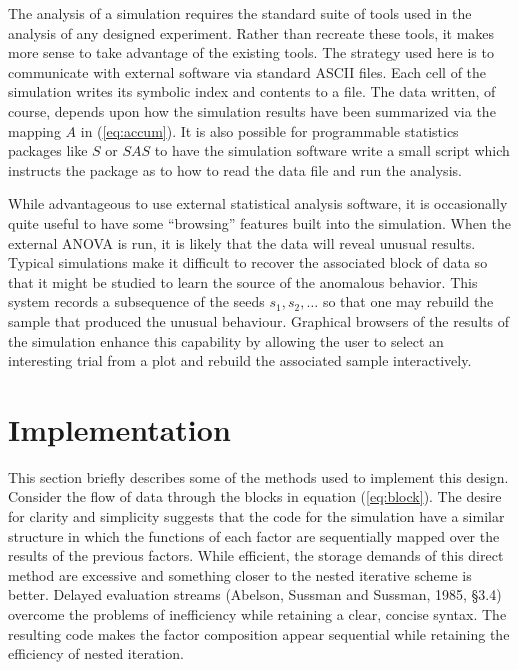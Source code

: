 The analysis of a simulation requires the standard suite of tools
used in the analysis of any designed experiment.  Rather than
recreate these tools, it makes more sense to take advantage of the
existing tools. The strategy used here is to communicate with
external software via standard ASCII files.  Each cell of the
simulation writes its symbolic index and contents to a file. The data
written, of course, depends upon how the simulation results have been
summarized via the mapping $A$ in (\ref{eq:accum}).  It is also
possible for programmable statistics packages like $S$ or $SAS$ to
have the simulation software write a small script which instructs the
package as to how to read the data file and run the analysis.  


While advantageous to use external statistical analysis software, it
is occasionally quite useful to have some ``browsing'' features built
into the simulation.  When the external ANOVA is run, it is likely
that the data will reveal unusual results.   Typical simulations make
it difficult to recover the associated block of data so that it might
be studied to learn the source of the anomalous behavior.  This system
records a subsequence of the seeds $s_1, s_2,\ldots$ so that
one may rebuild the sample that produced the unusual behaviour.
Graphical browsers of the results of the simulation enhance this
capability by allowing the user to select an interesting trial from a
plot and rebuild the associated sample interactively. 



\section{Implementation}


This section briefly describes some of the methods used to 
implement this design. Consider the flow of data through the
blocks in equation (\ref{eq:block}).  The desire for clarity and
simplicity suggests that the code for the simulation have a
similar structure in which the functions of each factor are sequentially
mapped over the results of the previous factors. While efficient, the
storage demands of this direct method are excessive and something
closer to the nested iterative scheme is better. Delayed evaluation
streams (Abelson, Sussman and Sussman, 1985, \S3.4) overcome the
problems of inefficiency while retaining a clear, concise syntax.  The
resulting code makes the factor composition appear sequential while
retaining the efficiency of nested iteration.


